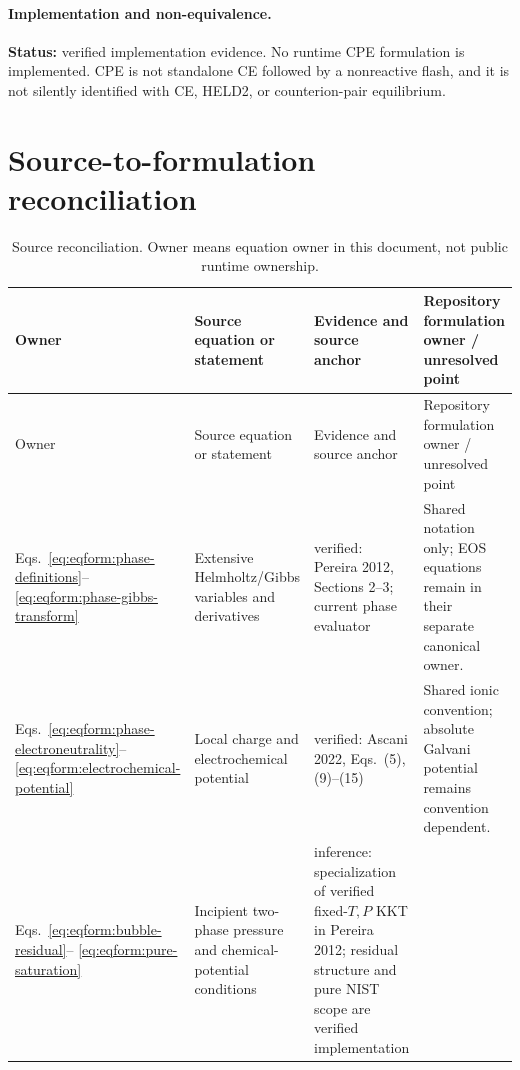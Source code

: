 \documentclass[11pt]{article}
\newcommand{\Evidence}[1]{\textsf{#1}}
\newcommand{\Status}[1]{\textbf{Status:} \Evidence{#1}.}
\begin{document}
\paragraph{Implementation and non-equivalence.}
\Status{verified implementation evidence}
No runtime CPE formulation is implemented. CPE is not standalone CE followed
by a nonreactive flash, and it is not silently identified with CE, HELD2, or
counterion-pair equilibrium.

\section{Source-to-formulation reconciliation}
\label{sec:eqform:reconciliation}

\small
\begin{longtable}{>{\raggedright\arraybackslash}p{}
                  >{\raggedright\arraybackslash}p{}
                  >{\raggedright\arraybackslash}p{}
                  >{\raggedright\arraybackslash}p{}}
\caption{Source reconciliation. Owner means equation owner in this document,
not public runtime ownership.}
\label{tab:eqform:reconciliation}\\
\toprule
Owner & Source equation or statement & Evidence and source anchor &
Repository formulation owner / unresolved point \\
\midrule
\endfirsthead
\toprule
Owner & Source equation or statement & Evidence and source anchor &
Repository formulation owner / unresolved point \\
\midrule
\endhead
Eqs.~\eqref{eq:eqform:phase-definitions}--%
\eqref{eq:eqform:phase-gibbs-transform} &
Extensive Helmholtz/Gibbs variables and derivatives &
\Evidence{verified}: Pereira 2012, Sections 2--3; current phase evaluator &
Shared notation only; EOS equations remain in their separate canonical owner. \\
\addlinespace
Eqs.~\eqref{eq:eqform:phase-electroneutrality}--%
\eqref{eq:eqform:electrochemical-potential} &
Local charge and electrochemical potential &
\Evidence{verified}: Ascani 2022, Eqs.~(5), (9)--(15) &
Shared ionic convention; absolute Galvani potential remains convention
dependent. \\
\addlinespace
Eqs.~\eqref{eq:eqform:bubble-residual}--%
\eqref{eq:eqform:pure-saturation} &
Incipient two-phase pressure and chemical-potential conditions &
\Evidence{inference}: specialization of verified fixed-\(T,P\) KKT in Pereira
2012; residual structure and pure NIST scope are verified implementation

\end{longtable}
\end{document}
